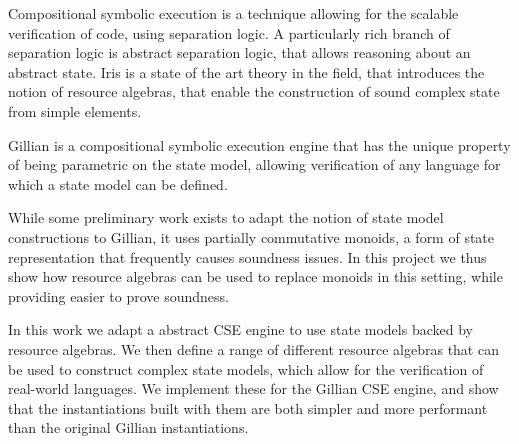 Compositional symbolic execution is a technique allowing for the scalable verification of code, using separation logic. A particularly rich branch of separation logic is abstract separation logic, that allows reasoning about an abstract state. Iris is a state of the art theory in the field, that introduces the notion of resource algebras, that enable the construction of sound complex state from simple elements.

Gillian is a compositional symbolic execution engine that has the unique property of being parametric on the state model, allowing verification of any language for which a state model can be defined.

While some preliminary work exists to adapt the notion of state model constructions to Gillian, it uses partially commutative monoids, a form of state representation that frequently causes soundness issues. In this project we thus show how resource algebras can be used to replace monoids in this setting, while providing easier to prove soundness.

In this work we adapt a abstract CSE engine to use state models backed by resource algebras. We then define a range of different resource algebras that can be used to construct complex state models, which allow for the verification of real-world languages. We implement these for the Gillian CSE engine, and show that the instantiations built with them are both simpler and more performant than the original Gillian instantiations.